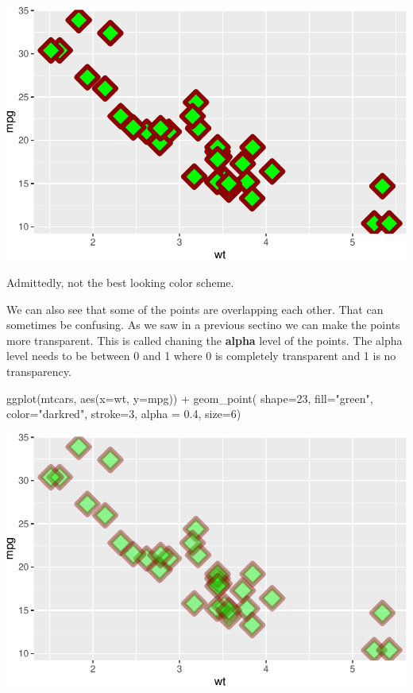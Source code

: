 \documentclass[
  letterpaper,
  DIV=11,
  numbers=noendperiod]{scrreprt}
\newenvironment{Shaded}{\begin{snugshade}}{\end{snugshade}}
\newcommand{\AttributeTok}[1]{\textcolor[rgb]{0.40,0.45,0.13}{#1}}
\newcommand{\DecValTok}[1]{\textcolor[rgb]{0.68,0.00,0.00}{#1}}
\newcommand{\FloatTok}[1]{\textcolor[rgb]{0.68,0.00,0.00}{#1}}
\newcommand{\FunctionTok}[1]{\textcolor[rgb]{0.28,0.35,0.67}{#1}}
\newcommand{\NormalTok}[1]{\textcolor[rgb]{0.00,0.23,0.31}{#1}}
\newcommand{\SpecialCharTok}[1]{\textcolor[rgb]{0.37,0.37,0.37}{#1}}
\newcommand{\StringTok}[1]{\textcolor[rgb]{0.13,0.47,0.30}{#1}}
\begin{document}
\includegraphics{Advanced_Scatterplot_Techniques_files/figure-pdf/unnamed-chunk-7-1.pdf}

Admittedly, not the best looking color scheme.

We can also see that some of the points are overlapping each other. That
can sometimes be confusing. As we saw in a previous sectino we can make
the points more transparent. This is called chaning the \textbf{alpha}
level of the points. The alpha level needs to be between 0 and 1 where 0
is completely transparent and 1 is no transparency.

\begin{Shaded}
\begin{Highlighting}[]
\FunctionTok{ggplot}\NormalTok{(mtcars, }\FunctionTok{aes}\NormalTok{(}\AttributeTok{x=}\NormalTok{wt, }\AttributeTok{y=}\NormalTok{mpg)) }\SpecialCharTok{+}
  \FunctionTok{geom\_point}\NormalTok{( }\AttributeTok{shape=}\DecValTok{23}\NormalTok{, }\AttributeTok{fill=}\StringTok{"green"}\NormalTok{, }\AttributeTok{color=}\StringTok{"darkred"}\NormalTok{, }\AttributeTok{stroke=}\DecValTok{3}\NormalTok{, }
              \AttributeTok{alpha =} \FloatTok{0.4}\NormalTok{, }\AttributeTok{size=}\DecValTok{6}\NormalTok{)}
\end{Highlighting}
\end{Shaded}

\includegraphics{Advanced_Scatterplot_Techniques_files/figure-pdf/unnamed-chunk-8-1.pdf}
\end{document}
